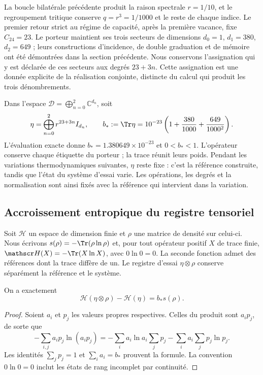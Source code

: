 La boucle bilatérale précédente produit la raison spectrale $r=1/10$, et le
regroupement tritique conserve $q=r^3=1/1000$ et le reste de chaque indice.
Le premier retour strict au régime de capacité, après la première
vacance, fixe $C_{24}=23$. Le porteur maintient ses trois secteurs de
dimensions $d_0=1$, $d_1=380$, $d_2=649$ ; leurs constructions
d’incidence, de double graduation et de mémoire ont été démontrées dans la section
précédente. Nous conservons l’assignation qui y est déclarée de ces secteurs aux
degrés $23+3n$. Cette assignation est une donnée explicite de la réalisation
conjointe, distincte du calcul qui produit les trois dénombrements.

Dans l’espace $\mathcal D=\bigoplus_{n=0}^2\mathbb C^{d_n}$, soit
\begin{equation}
 \eta=\bigoplus_{n=0}^2r^{23+3n}I_{d_n},\qquad
 b_*:=\Tr\eta
 =10^{-23}\left(1+\frac{380}{1000}+\frac{649}{1000^2}\right).
 \label{eq:ii-ter27-eta}
\end{equation}
L’évaluation exacte donne $b_*=1.380649\times10^{-23}$ et $0<b_*<1$.
L’opérateur conserve chaque étiquette du porteur ; la trace réunit leurs poids.
Pendant les variations thermodynamiques suivantes, $\eta$ reste fixe :
c’est la référence construite, tandis que l’état du système d’essai varie.
Les opérations, les degrés et la normalisation sont ainsi fixés avec
la référence qui intervient dans la variation.

\subsection{Accroissement entropique du registre tensoriel}
\label{subsec:ii-ter27-tensor}

Soit $\mathcal H$ un espace de dimension finie et $\rho$ une matrice de
densité sur celui-ci. Nous écrivons $s(\rho)=-\Tr(\rho\ln\rho)$ et, pour
tout opérateur positif $X$ de trace finie,
$\mathscr H(X)=-\Tr(X\ln X)$, avec $0\ln0=0$. La seconde fonction
admet des références dont la trace diffère de un. Le registre d’essai
$\eta\otimes\rho$ conserve séparément la référence et le système.

\begin{theorem}
\label{thm:ii-ter27-tensor}
On a exactement
\begin{equation}
 \mathscr H(\eta\otimes\rho)-\mathscr H(\eta)=b_*s(\rho).
 \label{eq:ii-ter27-tensor}
\end{equation}
\end{theorem}
\begin{proof}
Soient $a_i$ et $p_j$ les valeurs propres respectives. Celles du produit sont
$a_ip_j$, de sorte que
\[
 -\sum_{i,j}a_ip_j\ln(a_ip_j)
 =-\sum_i a_i\ln a_i\sum_jp_j
   -\sum_i a_i\sum_jp_j\ln p_j.
\]
Les identités $\sum_jp_j=1$ et $\sum_i a_i=b_*$ prouvent la formule.
La convention $0\ln0=0$ inclut les états de rang incomplet par continuité.
\end{proof}

